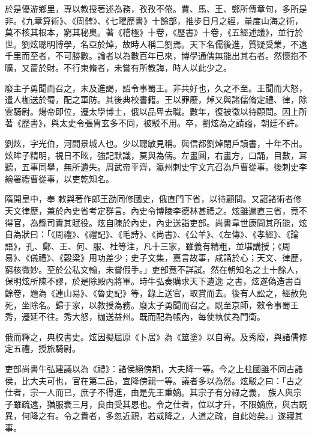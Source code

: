 \begin{pinyinscope}
 於是優游鄉里，專以教授著述為務，孜孜不倦。賈、馬、王、鄭所傳章句，多所是非。《九章算術》、《周髀》、《七曜歷書》十餘部，推步日月之經，量度山海之術，莫不核其根本，窮其秘奧。著《稽極》十卷，《歷書》十卷，《五經述議》，並行於世。劉炫聰明博學，名亞於焯，故時人稱二劉焉。天下名儒後進，質疑受業，不遠千里而至者，不可勝數。論者以為數百年已來，博學通儒無能出其右者。然懷抱不曠，又嗇於財。不行束脩者，未嘗有所教誨，時人以此少之。



 廢主子勇聞而召之，未及進謁，詔令事蜀王。非共好也，久之不至。王聞而大怒，
 遣人枷送於蜀，配之軍防。其後典校書籍。王以罪廢，焯又與諸儒脩定禮、律，除雲騎尉。煬帝即位，遷太學博士，俄以品卑去職。數年，復被徵以待顧問。因上所著《歷書》，與太史令張胄玄多不同，被駁不用。卒，劉炫為之請謚，朝廷不許。



 劉炫，字光伯，河間景城人也。少以聰敏見稱。與信都劉焯閉戶讀書，十年不出。炫眸子精明，視日不眩，強記默識，莫與為儔。左畫圓，右畫方，口誦，目數，耳聽，五事同舉，無所遺失。周武帝平齊，瀛州刺史宇文亢召為戶曹從事。後刺史李繪署禮曹從事，以吏乾知名。



 隋開皇中，奉
 敕與著作郎王劭同修國史，俄直門下省，以待顧問。又詔諸術者修天文律歷，兼於內史省考定群言。內史令博陵李德林甚禮之。炫雖遍直三省，竟不得官，為縣司責其賦役。炫自陳於內史，內史送詣吏部。尚書韋世康問其所能，炫自為狀曰：「《周禮》、《禮記》、《毛詩》、《尚書》、《公羊》、《左傳》、《孝經》、《論語》，孔、鄭、王、何、服、杜等注，凡十三家，雖義有精粗，並堪講授；《周易》、《儀禮》、《穀梁》用功差少；史子文集，嘉言故事，咸誦於心；天文、律歷，窮核微妙。至於公私文翰，未嘗假手。」吏部竟不詳試。然在朝知名之士十餘人，保明炫所陳不謬，於是除殿內將軍。時牛弘奏購求天下遺逸
 之書，炫遂偽造書百餘卷，題為《連山易》、《魯史記》等，錄上送官，取賞而去。後有人訟之，經赦免死，坐除名。歸于家，以教授為務。廢太子勇聞而召之。既至京師，敕令事蜀王秀，遷延不往。秀大怒，枷送益州。既而配為帳內，每使執仗為門衛。



 俄而釋之，典校書史。炫因擬屈原《卜居》為《筮塗》以自寄。及秀廢，與諸儒修定五禮，授旅騎尉。



 吏部尚書牛弘建議以為《禮》：諸侯絕傍期，大夫降一等。今之上柱國雖不同古諸侯，比大夫可也，官在第二品，宜降傍親一等。議者多以為然。炫駁之曰：「古之仕者，宗一人而已，庶子不得進，由是先王重嫡。其宗子有分祿之義，
 族人與宗子雖疏遠，猶服衰三月，良由受其恩也。令之仕者，位以才升，不限嫡庶，與古既異，何降之有。令之貴者，多忽近親，若或降之，人道之疏，自此始矣。」遂寢其事。




\end{pinyinscope}
